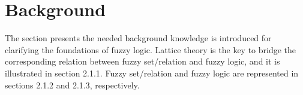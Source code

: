 \documentclass[egilmezThesis.tex]{subfiles}
\begin{document}
\section{Background}
\label{chap:Background}
The section presents the needed background knowledge is introduced for clarifying the foundations of fuzzy logic. Lattice theory \cite{DP03} is the key to bridge the corresponding relation between fuzzy set/relation and fuzzy logic, and it is illustrated in section 2.1.1. Fuzzy set/relation and fuzzy logic are represented in sections 2.1.2 and 2.1.3, respectively.




 

\end{document}
